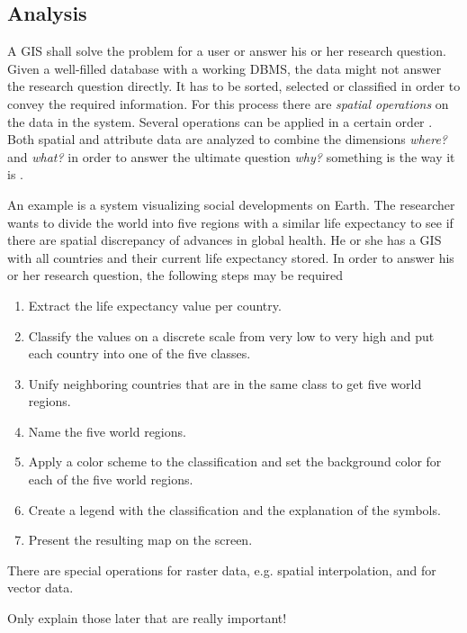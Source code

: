 \subsection{Analysis} %
\label{ssub:analysis}

A GIS shall solve the problem for a user or answer his or her research question. Given a well-filled database with a working DBMS, the data might not answer the research question directly. It has to be sorted, selected or classified in order to convey the required information. For this process there are \emph{spatial operations} on the data in the system. Several operations can be applied in a certain order
\cite[pp. 321-325]{bolstad2008gis}.
Both spatial and attribute data are analyzed to combine the dimensions \emph{where?} and \emph{what?} in order to answer the ultimate question \emph{why?} something is the way it is
\cite[p.xii-xvi]{knowles2002past}.

An example is a system visualizing social developments on Earth. The researcher wants to divide the world into five regions with a similar life expectancy to see if there are spatial discrepancy of advances in global health. He or she has a GIS with all countries and their current life expectancy stored. In order to answer his or her research question, the following steps may be required

\begin{enumerate}
  \item Extract the life expectancy value per country.
  \item Classify the values on a discrete scale from very low to very high and put each country into one of the five classes.
  \item Unify neighboring countries that are in the same class to get five world regions.
  \item Name the five world regions.
  \item Apply a color scheme to the classification and set the background color for each of the five world regions.
  \item Create a legend with the classification and the explanation of the symbols.
  \item Present the resulting map on the screen.
\end{enumerate}

There are special operations for raster data, e.g. spatial interpolation, and for vector data.

Only explain those later that are really important!

